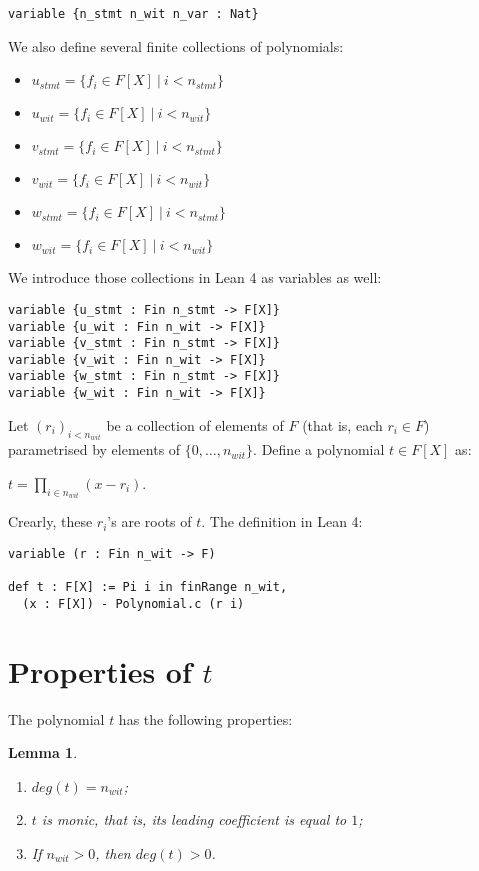 \documentclass{article}
\newtheorem{lemma}{Lemma}
\theoremstyle{definition}
\theoremstyle{remark}
\begin{document}
\begin{lstlisting}
variable {n_stmt n_wit n_var : Nat}
\end{lstlisting}

We also define several finite collections of polynomials:

\begin{itemize}
\item $u_{stmt} = \{ f_{i} \in F[X] \: | \: i < n_{stmt} \}$
\item $u_{wit} = \{ f_{i} \in F[X] \: | \: i < n_{wit} \}$
\item $v_{stmt} = \{ f_{i} \in F[X] \: | \: i < n_{stmt} \}$
\item $v_{wit} = \{ f_{i} \in F[X] \: | \: i < n_{wit} \}$
\item $w_{stmt} = \{ f_{i} \in F[X] \: | \: i < n_{stmt} \}$
\item $w_{wit} = \{ f_{i} \in F[X] \: | \: i < n_{wit} \}$
\end{itemize}

We introduce those collections in Lean 4 as variables as well:

\begin{lstlisting}
variable {u_stmt : Fin n_stmt -> F[X]}
variable {u_wit : Fin n_wit -> F[X]}
variable {v_stmt : Fin n_stmt -> F[X]}
variable {v_wit : Fin n_wit -> F[X]}
variable {w_stmt : Fin n_stmt -> F[X]}
variable {w_wit : Fin n_wit -> F[X]}
\end{lstlisting}

Let $(r_i)_{i < n_{wit}}$ be a collection of elements of $F$ (that is, each $r_i \in F$) parametrised by elements of $\{0, \dots, n_{wit} \}$. Define a polynomial $t \in F[X]$ as:
\begin{center}
$t = \prod \limits_{i \in n_{wit}} (x - r_i)$.
\end{center}

Crearly, these $r_i$'s are roots of $t$. The definition in Lean 4:
\begin{lstlisting}
variable (r : Fin n_wit -> F)

def t : F[X] := Pi i in finRange n_wit,
  (x : F[X]) - Polynomial.c (r i)
\end{lstlisting}

\section{Properties of $t$}

The polynomial $t$ has the following properties:

\begin{lemma}
$ $

\begin{enumerate}
\item $deg(t) = n_{wit}$;
\item $t$ is monic, that is, its leading coefficient is equal to $1$;
\item If $n_{wit} > 0$, then $deg(t) > 0$.
\end{enumerate}
\end{lemma}
\end{document}
